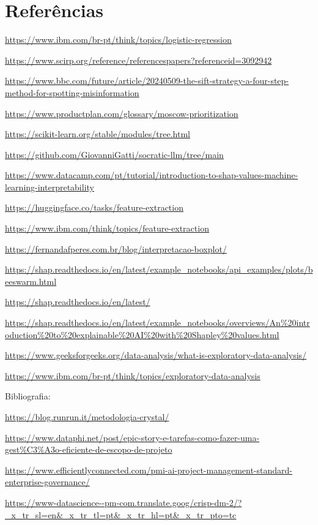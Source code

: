 \documentclass[
  brazilian,
  11pt,
]{article}
\begin{document}
\section{Referências}\label{referuxeancias}

\url{https://www.ibm.com/br-pt/think/topics/logistic-regression}

\url{https://www.scirp.org/reference/referencespapers?referenceid=3092942}

\url{https://www.bbc.com/future/article/20240509-the-sift-strategy-a-four-step-method-for-spotting-misinformation}

\url{https://www.productplan.com/glossary/moscow-prioritization}

\url{https://scikit-learn.org/stable/modules/tree.html}

\url{https://github.com/GiovanniGatti/socratic-llm/tree/main}

\url{https://www.datacamp.com/pt/tutorial/introduction-to-shap-values-machine-learning-interpretability}

\url{https://huggingface.co/tasks/feature-extraction}

\url{https://www.ibm.com/think/topics/feature-extraction}

\url{https://fernandafperes.com.br/blog/interpretacao-boxplot/}

\url{https://shap.readthedocs.io/en/latest/example_notebooks/api_examples/plots/beeswarm.html}

\url{https://shap.readthedocs.io/en/latest/}

\url{https://shap.readthedocs.io/en/latest/example_notebooks/overviews/An\%20introduction\%20to\%20explainable\%20AI\%20with\%20Shapley\%20values.html}

\url{https://www.geeksforgeeks.org/data-analysis/what-is-exploratory-data-analysis/}

\url{https://www.ibm.com/br-pt/think/topics/exploratory-data-analysis}

Bibliografia:

\url{https://blog.runrun.it/metodologia-crystal/}

\href{https://www.dataphi.net/post/epic-story-e-task-como-fazer-uma-gest\%C3\%A3o-eficiente-de-escopo-de-projeto}{https://www.dataphi.net/post/epic-story-e-tarefas-como-fazer-uma-gest\%C3\%A3o-eficiente-de-escopo-de-projeto}

\url{https://www.efficientlyconnected.com/pmi-ai-project-management-standard-enterprise-governance/}

\url{https://www-datascience--pm-com.translate.goog/crisp-dm-2/?_x_tr_sl=en&_x_tr_tl=pt&_x_tr_hl=pt&_x_tr_pto=tc}
\end{document}
